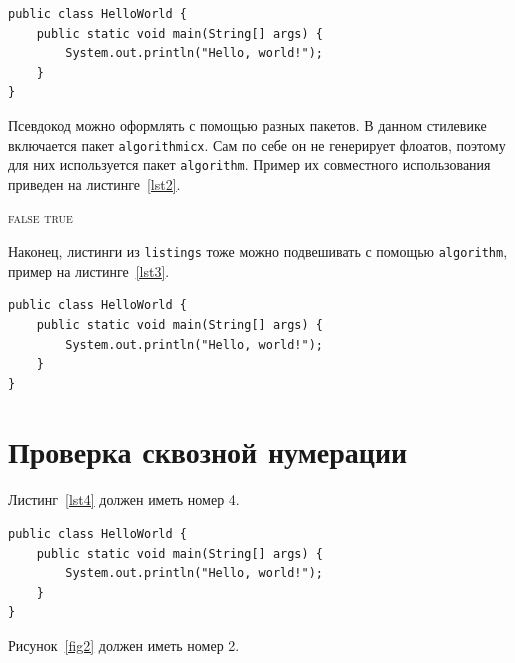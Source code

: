 \documentclass[specification,annotation,times]{itmo-student-thesis}
\begin{document}
\begin{lstlisting}[float=!h,caption={Пример исходного кода на Java},label={lst1}]
public class HelloWorld {
    public static void main(String[] args) {
        System.out.println("Hello, world!");
    }
}
\end{lstlisting}

Псевдокод можно оформлять с помощью разных пакетов. В данном стилевике включается пакет \texttt{algorithmicx}.
Сам по себе он не генерирует флоатов, поэтому для них используется пакет \texttt{algorithm}.
Пример их совместного использования приведен на листинге~\ref{lst2}.

\begin{algorithm}[!h]
\caption{Пример псевдокода}\label{lst2}
\begin{algorithmic}
				\State\Return \textsc{false}
			\EndIf
		\EndFor
		\State\Return \textsc{true}
	\EndFunction
\end{algorithmic}
\end{algorithm}

Наконец, листинги из \texttt{listings} тоже можно подвешивать с помощью \texttt{algorithm},
пример на листинге~\ref{lst3}.

\begin{algorithm}[!h]
\caption{Исходный код и флоат \texttt{algorithm}}\label{lst3}
\begin{lstlisting}
public class HelloWorld {
    public static void main(String[] args) {
        System.out.println("Hello, world!");
    }
}
\end{lstlisting}
\end{algorithm}

\chapter{Проверка сквозной нумерации}

Листинг~\ref{lst4} должен иметь номер 4.

\begin{algorithm}[!h]
\caption{Исходный код и флоат \texttt{algorithm}}\label{lst4}
\begin{lstlisting}
public class HelloWorld {
    public static void main(String[] args) {
        System.out.println("Hello, world!");
    }
}
\end{lstlisting}
\end{algorithm}

Рисунок~\ref{fig2} должен иметь номер 2.
\end{document}
